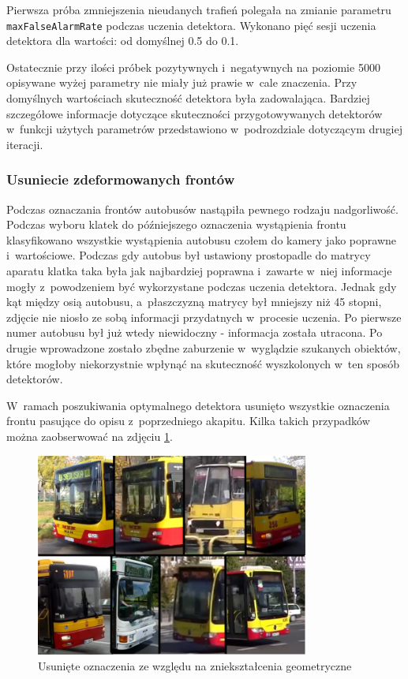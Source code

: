 Pierwsza próba zmniejszenia nieudanych trafień polegała na zmianie 
parametru \verb|maxFalseAlarmRate| podczas uczenia detektora. 
Wykonano pięć
sesji uczenia detektora dla wartości: od domyślnej 0.5 do 0.1.

Ostatecznie przy ilości próbek pozytywnych i~negatywnych 
na poziomie 5000 opisywane wyżej parametry nie miały już prawie w~cale
znaczenia. Przy domyślnych wartościach skuteczność detektora była 
zadowalająca. Bardziej szczegółowe informacje dotyczące skuteczności
przygotowywanych detektorów w~funkcji użytych parametrów
przedstawiono w~podrozdziale dotyczącym drugiej iteracji.

\subsubsection{Usuniecie zdeformowanych frontów}

Podczas oznaczania frontów autobusów nastąpiła pewnego rodzaju
nadgorliwość. Podczas wyboru klatek do późniejszego oznaczenia
wystąpienia frontu klasyfikowano wszystkie wystąpienia autobusu
czołem do kamery jako poprawne i~wartościowe. Podczas gdy autobus
był ustawiony prostopadle do matrycy aparatu klatka taka była
jak najbardziej poprawna i~zawarte w~niej informacje mogły
z~powodzeniem być wykorzystane podczas uczenia detektora. Jednak
gdy kąt między osią autobusu, a~płaszczyzną matrycy był mniejszy
niż 45 stopni, zdjęcie nie niosło ze sobą informacji przydatnych
w~procesie uczenia. Po pierwsze numer autobusu był już wtedy
niewidoczny - informacja została utracona. Po drugie wprowadzone
zostało zbędne zaburzenie w~wyglądzie szukanych obiektów,
które mogłoby niekorzystnie wpłynąć na skuteczność wyszkolonych
w~ten sposób detektorów.

W~ramach poszukiwania optymalnego detektora
usunięto wszystkie oznaczenia frontu pasujące do opisu
z~poprzedniego akapitu. Kilka takich przypadków można
zaobserwować na zdjęciu \ref{fig:deformation_samples}.

\begin{figure}[h!]
    \centering
    \includegraphics[width=0.8\textwidth]{img/exp_removed_distorted_fronts}
    \caption{Usunięte oznaczenia ze względu na zniekształcenia geometryczne}
    \label{fig:deformation_samples}
\end{figure}

